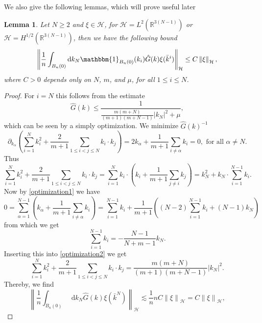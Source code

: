 \documentclass[a4paper,11pt]{article}
\newcommand{\norm}[1]{\left\lVert #1 \right\rVert}
\newcommand{\abs}[1]{\left\lvert #1 \right\rvert}
\newcommand*\diff{\mathop{}\!\mathrm{d}}
\newcommand{\R}{\mathbb{R}}
\newtheorem{lemma}{Lemma}
\numberwithin{equation}{section}
\begin{document}
We also give the following lemmas, which will prove useful later
\begin{lemma}\label{lemmaGxi} Let $ N\geq2 $ and $ \xi\in \mathcal{H} $, for $ \mathcal{H}=L^2(\R^{3(N-1)}) $ or $ \mathcal{H}=H^{1/2}(\R^{3(N-1)}) $, then we have the following bound
	\begin{equation}
	\norm{\frac{1}{n}\int_{B_n(0)}\diff k_N\mathbbm{1}_{B_n(0)}(k_i)\hat{G}(k)\xi(\bar{k}^i)}_{\mathcal{H}}\leq C\norm{\xi}_{\mathcal{H}},
	\end{equation}
	where $ C>0 $ depends only on $ N $, $ m $, and $ \mu $, for all $ 1\leq i\leq N $.
\end{lemma}
\begin{proof}
	For $ i=N $ this follows from the estimate \begin{equation}
	\hat{G}(k)\leq\frac{1}{\frac{m (m+N)}{(m+1) (m+N-1)}\abs{k_N}^2+\mu},
	\end{equation}
	which can be seen by a simply optimization. We minimize $ \hat{G}(k)^{-1} $ \begin{equation}\label{optimization1}
	\partial_{k_\alpha}\left(\sum_{i=1}^{N}k_i^2+\frac{2}{m+1}\sum_{1\leq i<j\leq N}k_i\cdot k_j\right)=2k_\alpha+\frac{1}{m+1}\sum_{i\neq\alpha}k_i=0,\text{ for all }\alpha\neq N.
	\end{equation}
	Thus \begin{equation}\label{optimization2}
	\sum_{i=1}^{N}k_i^2+\frac{2}{m+1}\sum_{1\leq i<j\leq N}k_i\cdot k_j=\sum_{i=1}^{N}k_i\cdot\left(k_i+\frac{1}{m+1}\sum_{j\neq i}k_j\right)=k_N^2+k_N\cdot\sum_{i=1}^{N-1}k_i.
	\end{equation}
	Now by \eqref{optimization1} we have \begin{equation}
	0=\sum_{\alpha=1}^{N-1}\left(k_\alpha+\frac{1}{m+1}\sum_{i\neq\alpha}k_i\right)=\sum_{i=1}^{N-1}k_i+\frac{1}{m+1}\left((N-2)\sum_{i=1}^{N-1}k_i+(N-1)k_N\right)
	\end{equation}
	from which we get \begin{equation}
	\sum_{i=1}^{N-1}k_i=-\frac{N-1}{N+m-1}k_N.
	\end{equation}
	Inserting this into \eqref{optimization2} we get \begin{equation}
	\sum_{i=1}^{N}k_i^2+\frac{2}{m+1}\sum_{1\leq i<j\leq N}k_i\cdot k_j=\frac{m (m+N)}{(m+1) (m+N-1)}\abs{k_N}^2.
	\end{equation}
	Thereby, we find\begin{equation}
	\norm{\frac{1}{n}\int_{B_n(0)} \diff k_N \hat{G}(k)\xi(\bar{k}^N)}_{\mathcal{H}}\lesssim\frac{1}{n}nC\norm{\xi}_{\mathcal{H}}=C\norm{\xi}_{\mathcal{H}},

\end{equation}
\end{proof}
\end{document}
